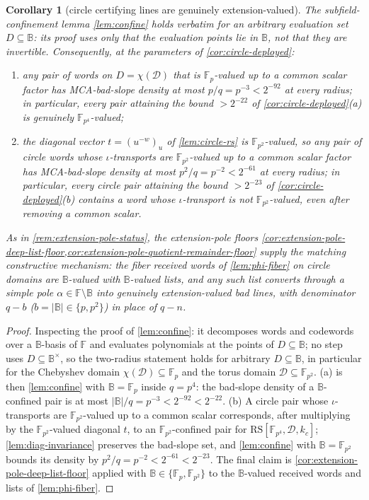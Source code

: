 \documentclass[11pt]{article}
\newtheorem{corollary}[corollary]{Corollary}
\theoremstyle{definition}
\theoremstyle{remark}
\newcommand{\F}{\mathbb{F}}
\newcommand{\B}{\mathbb{B}}
\newcommand{\RS}{\mathrm{RS}}
\begin{document}
\begin{corollary}[circle certifying lines are genuinely extension-valued]\label{cor:circle-Fvalued}
The subfield-confinement lemma \cref{lem:confine} holds verbatim for an arbitrary evaluation set $D\subseteq\B$: its proof uses only that the evaluation points lie in $\B$, not that they are invertible. Consequently, at the parameters of \cref{cor:circle-deployed}:
\begin{enumerate}[label=\textup{(\alph*)}]
\item any pair of words on $D=\chi(\mathcal D)$ that is $\F_p$-valued up to a common scalar factor has MCA-bad-slope density at most $p/q=p^{-3}<2^{-92}$ at every radius; in particular, every pair attaining the bound $>2^{-22}$ of \cref{cor:circle-deployed}\textup{(a)} is genuinely $\F_{p^4}$-valued;
\item the diagonal vector $t=(u^{-w})_{u}$ of \cref{lem:circle-rs} is $\F_{p^2}$-valued, so any pair of circle words whose $\iota$-transports are $\F_{p^2}$-valued up to a common scalar factor has MCA-bad-slope density at most $p^2/q=p^{-2}<2^{-61}$ at every radius; in particular, every circle pair attaining the bound $>2^{-23}$ of \cref{cor:circle-deployed}\textup{(b)} contains a word whose $\iota$-transport is not $\F_{p^2}$-valued, even after removing a common scalar.
\end{enumerate}
As in \cref{rem:extension-pole-status}, the extension-pole floors \cref{cor:extension-pole-deep-list-floor,cor:extension-pole-quotient-remainder-floor} supply the matching constructive mechanism: the fiber received words of \cref{lem:phi-fiber} on circle domains are $\B$-valued with $\B$-valued lists, and any such list converts through a simple pole $\alpha\in\F\setminus\B$ into genuinely extension-valued bad lines, with denominator $q-b$ ($b=|\B|\in\{p,p^2\}$) in place of $q-n$.
\end{corollary}

\begin{proof}
Inspecting the proof of \cref{lem:confine}: it decomposes words and codewords over a $\B$-basis of $\F$ and evaluates polynomials at the points of $D\subseteq\B$; no step uses $D\subseteq\B^{\times}$, so the two-radius statement holds for arbitrary $D\subseteq\B$, in particular for the Chebyshev domain $\chi(\mathcal D)\subseteq\F_p$ and the torus domain $\mathcal D\subseteq\F_{p^2}$. (a) is then \cref{lem:confine} with $\B=\F_p$ inside $q=p^4$: the bad-slope density of a $\B$-confined pair is at most $|\B|/q=p^{-3}<2^{-92}<2^{-22}$. (b) A circle pair whose $\iota$-transports are $\F_{p^2}$-valued up to a common scalar corresponds, after multiplying by the $\F_{p^2}$-valued diagonal $t$, to an $\F_{p^2}$-confined pair for $\RS[\F_{p^4},\mathcal D,k_c]$; \cref{lem:diag-invariance} preserves the bad-slope set, and \cref{lem:confine} with $\B=\F_{p^2}$ bounds its density by $p^2/q=p^{-2}<2^{-61}<2^{-23}$. The final claim is \cref{cor:extension-pole-deep-list-floor} applied with $\B\in\{\F_p,\F_{p^2}\}$ to the $\B$-valued received words and lists of \cref{lem:phi-fiber}.
\end{proof}
\end{document}
